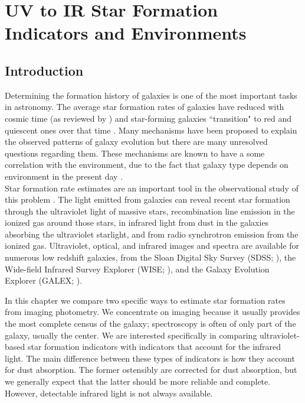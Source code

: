\chapter{UV to IR Star Formation Indicators and Environments}
\label{ch:sfrk}

\newpage
\section{Introduction}
Determining the formation history of galaxies is one of the most important tasks in astronomy. The average star formation rates of galaxies have reduced with cosmic time (as reviewed by \citealt{madau_cosmic_2014}) and star-forming galaxies ``transition" to red and quiescent ones over that time \citep[\emph{e.g.}][among others]{peng_mass_2010, ilbert_mass_2013, muzzin_evolution_2013, moustakas_primus_2013, tomczak_galaxy_2014}. Many mechanisms have been proposed to explain the observed patterns of galaxy evolution but there are many unresolved questions regarding them. These mechanisms are known to have a some correlation with the environment, due to the fact that galaxy type depends on environment in the present day \citep{dressler_galaxy_1980, blanton_physical_2009-1}.\\

Star formation rate estimates are an important tool in the observational study of this problem \citep{kennicutt_star_2012}. The light emitted from galaxies can reveal recent star formation through the ultraviolet light of massive stars, recombination line emission in the ionized gas around those stars, in infrared light from dust in the galaxies absorbing the ultraviolet starlight, and from radio synchrotron emission from the ionized gas. Ultraviolet, optical, and infrared images and spectra are available for numerous low redshift galaxies, from the Sloan Digital Sky Survey (SDSS; \citet{york00a}), the Wide-field Infrared Survey Explorer (WISE; \citet{wright_wide-field_2010}), and the Galaxy Evolution Explorer (GALEX; \citet{martin_galex2005}).

In this chapter we compare two specific ways to estimate star formation rates from imaging photometry. We concentrate on imaging because it usually provides the most complete census of the galaxy; spectroscopy is often of only part of the galaxy, usually the center. We are interested specifically in comparing ultraviolet-based star formation indicators with indicators that account for the infrared light. The main difference between these types of indicators is how they account for dust absorption. The former ostensibly are corrected for dust absorption, but we generally expect that the latter should be more reliable and complete. However, detectable infrared light is not always available.

